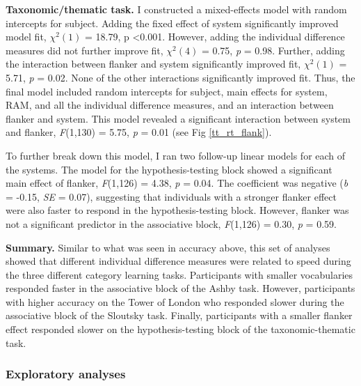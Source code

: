 \documentclass[../dissertation.tex]{subfiles}
\begin{document}
\textbf{Taxonomic/thematic task.}  I constructed a mixed-effects model with random intercepts for subject. Adding the fixed effect of system significantly improved model fit,  $\chi^{2}(1)$ = 18.79, p \textless 0.001. However, adding the individual difference measures did not further improve fit,  $\chi^{2}(4)$ = 0.75, \textit{p} = 0.98. Further, adding the interaction between flanker and system significantly improved fit, $\chi^{2}(1)$ = 5.71, \textit{p} = 0.02. None of the other interactions significantly improved fit. Thus, the final model included random intercepts for subject, main effects for system, RAM, and all the individual difference measures, and an interaction between flanker and system. This model revealed a significant interaction between system and flanker, \textit{F}(1,130) = 5.75, \textit{p} = 0.01 (see Fig \ref{tt_rt_flank}). \par 
	To further break down this model, I ran two follow-up linear models for each of the systems. The model for the hypothesis-testing block showed a significant main effect of flanker, \textit{F}(1,126) = 4.38, \textit{p} = 0.04. The coefficient was negative (\textit{b} = -0.15, \textit{SE} = 0.07), suggesting that individuals with a stronger flanker effect were also faster to respond in the hypothesis-testing block. However, flanker was not a significant predictor in the associative block, \textit{F}(1,126) = 0.30, \textit{p} = 0.59.  \par
\textbf{Summary.} Similar to what was seen in accuracy above, this set of analyses showed that different individual difference measures were related to speed during the three different category learning tasks. Participants with smaller vocabularies responded faster in the associative block of the Ashby task. However, participants with higher accuracy on the Tower of London who responded slower during the associative block of the Sloutsky task. Finally, participants with a smaller flanker effect responded slower on the hypothesis-testing block of the taxonomic-thematic task.

\subsubsection{Exploratory analyses}
\end{document}
